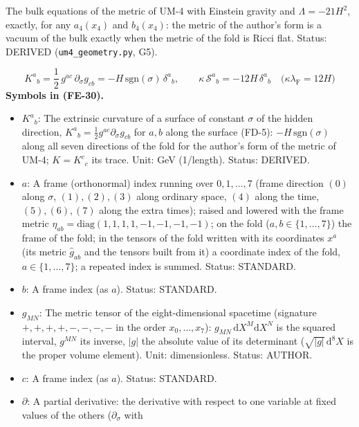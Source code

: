 \documentclass[
  10pt,
]{article}
\providecommand{\tightlist}{%
  \setlength{\itemsep}{0pt}\setlength{\parskip}{0pt}}
\begin{document}
The bulk equations of the metric of UM-4 with Einstein gravity and
\(\Lambda = -21H^2\), exactly, for any \(a_4(x_4)\) and \(b_4(x_4)\):
the metric of the author's form is a vacuum of the bulk exactly when the
metric of the fold is Ricci flat. Status: DERIVED
(\texttt{um4\_geometry.py}, G5).

\[
K^a{}_b = \frac12\,g^{ac}\,\partial_\sigma g_{cb} = -H\,\mathrm{sgn}(\sigma)\,\delta^a{}_b,\qquad
\kappa\,\mathcal{S}^a{}_b = -12H\,\delta^a{}_b\quad\big(\kappa\lambda_{\mathrm{F}} = 12H\big) \tag{FE-30}
\] \textbf{Symbols in (FE-30).}

\begin{itemize}
\tightlist
\item
  \(K^a{}_b\): The extrinsic curvature of a surface of constant
  \(\sigma\) of the hidden direction,
  \(K^a{}_b = \frac12 g^{ac}\partial_\sigma g_{cb}\) for \(a, b\) along
  the surface (FD-5): \(-H\,\mathrm{sgn}(\sigma)\) along all seven
  directions of the fold for the author's form of the metric of UM-4;
  \(K = K^c{}_c\) its trace. Unit: GeV (1/length). Status: DERIVED.
\item
  \(a\): A frame (orthonormal) index running over \(0, 1, \dots, 7\)
  (frame direction \((0)\) along \(\sigma\), \((1), (2), (3)\) along
  ordinary space, \((4)\) along the time, \((5), (6), (7)\) along the
  extra times); raised and lowered with the frame metric
  \(\eta_{ab} = \mathrm{diag}(1, 1, 1, 1, -1, -1, -1, -1)\); on the fold
  (\(a, b \in \{1, \dots, 7\}\)) the frame of the fold; in the tensors
  of the fold written with its coordinates \(x^a\) (its metric
  \(\hat g_{ab}\) and the tensors built from it) a coordinate index of
  the fold, \(a \in \{1, \dots, 7\}\); a repeated index is summed.
  Status: STANDARD.
\item
  \(b\): A frame index (as \(a\)). Status: STANDARD.
\item
  \(g_{MN}\): The metric tensor of the eight-dimensional spacetime
  (signature \(+,+,+,+,-,-,-,-\) in the order \(x_0, \dots, x_7\)):
  \(g_{MN}\,\mathrm{d}X^M\mathrm{d}X^N\) is the squared interval,
  \(g^{MN}\) its inverse, \(\lvert g\rvert\) the absolute value of its
  determinant (\(\sqrt{\lvert g\rvert}\,\mathrm{d}^8X\) is the proper
  volume element). Unit: dimensionless. Status: AUTHOR.
\item
  \(c\): A frame index (as \(a\)). Status: STANDARD.
\item
  \(\partial\): A partial derivative: the derivative with respect to one
  variable at fixed values of the others (\(\partial_\sigma\) with

\end{itemize}
\end{document}
